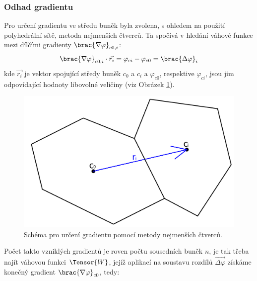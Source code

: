         \subsubsection{Odhad gradientu} \label{sec:odhad-gradientu}
            Pro určení gradientu ve středu buněk byla zvolena, s ohledem na použití polyhedrální sítě, metoda nejmenších čtverců. Ta spočívá v hledání váhové funkce mezi dílčími gradienty $\brac{\nabla \varphi}_{c0,i}$:
            \begin{equation}
                \brac{\nabla \varphi}_{c0,i} \cdot \Vec{r_i} = \varphi _{ci} - \varphi _{c0} = \brac{\Delta \varphi} _i
            \end{equation}
            \noindent kde $\Vec{r_i}$ je vektor spojující středy buněk $c_0$ a $c_i$ a $\varphi _{c0}$, respektive $\varphi _{ci}$, jsou jim odpovídající hodnoty libovolné veličiny (viz Obrázek \ref{fig:urceni-gradientu}). 
            \begin{figure}[ht!]
                \centering
                \includegraphics[width=.75\textwidth]{300_VYPOCETNI_MODEL/urceni_gradientu.png}
                \caption{Schéma pro určení gradientu pomocí metody nejmenších čtverců.}
                \label{fig:urceni-gradientu}
            \end{figure}
            Počet takto vzniklých gradientů je roven počtu sousedních buněk $n$, je tak třeba najít váhovou funkci $\Tensor{W}$, jejíž aplikací na soustavu rozdílů $\Vec{\Delta \varphi}$ získáme konečný gradient $\brac{\nabla \varphi} _{c0}$, tedy:
